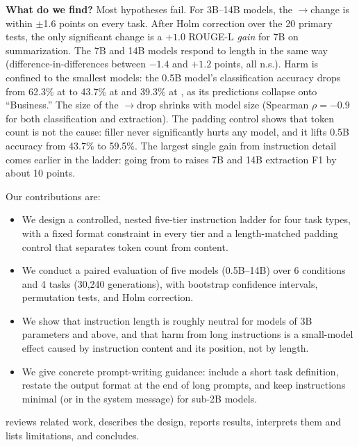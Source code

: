 {\bf What do we find?}
Most hypotheses fail.
For 3B--14B models, the \standard$\to$\exhaustive change is within $\pm$1.6 points on every task.
After Holm correction over the 20 primary tests, the only significant change is a $+1.0$ ROUGE-L \emph{gain} for 7B on summarization.
The 7B and 14B models respond to length in the same way (difference-in-differences between $-1.4$ and $+1.2$ points, all n.s.).
Harm is confined to the smallest models: the 0.5B model's classification accuracy drops from 62.3\% at \minimal to 43.7\% at \standard and 39.3\% at \exhaustive, as its predictions collapse onto ``Business.''
The size of the \standard$\to$\exhaustive drop shrinks with model size (Spearman $\rho=-0.9$ for both classification and extraction).
The padding control shows that token count is not the cause: filler never significantly hurts any model, and it lifts 0.5B accuracy from 43.7\% to 59.5\%.
The largest single gain from instruction detail comes earlier in the ladder: going from \minimal to \concise raises 7B and 14B extraction F1 by about 10 points.

Our contributions are:
\begin{itemize}[leftmargin=*,itemsep=0pt,topsep=0pt]
    \item We design a controlled, nested five-tier instruction ladder for four task types, with a fixed format constraint in every tier and a length-matched padding control that separates token count from content.
    \item We conduct a paired evaluation of five \qwen models (0.5B--14B) over 6 conditions and 4 tasks (30{,}240 generations), with bootstrap confidence intervals, permutation tests, and Holm correction.
    \item We show that instruction length is roughly neutral for models of 3B parameters and above, and that harm from long instructions is a small-model effect caused by instruction content and its position, not by length.
    \item We give concrete prompt-writing guidance: include a short task definition, restate the output format at the end of long prompts, and keep instructions minimal (or in the system message) for sub-2B models.
\end{itemize}

 reviews related work,  describes the design,  reports results,  interprets them and lists limitations, and  concludes.
